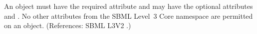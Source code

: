 An \AssignmentRule object must have the required attribute 
and may have the optional attributes   and .
No other attributes from the SBML Level~3 Core namespace are permitted on
an \AssignmentRule object.  (References: SBML L3V2
.)
